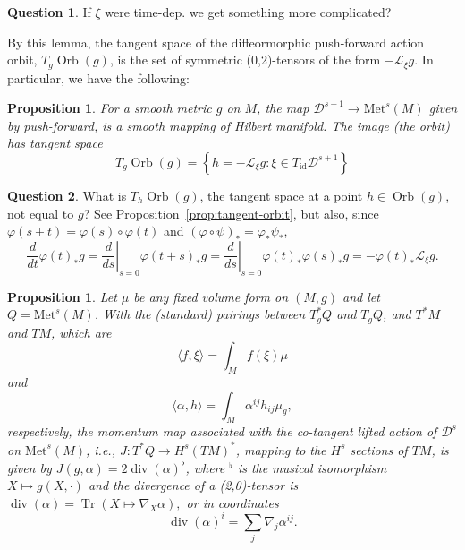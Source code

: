 \documentclass[a5paper,10pt,twoside]{article}
\newcommand{\cL}{\ensuremath{\mathcal{L}}}
\newcommand{\cD}{\ensuremath{\mathcal{D}}}
\newcommand{\Met}{\ensuremath{\mathrm{Met}}}
\DeclareMathOperator*{\Tr}{Tr}
\DeclareMathOperator*{\Orb}{Orb}
\DeclareMathOperator*{\Div}{div}
\DeclareMathOperator*{\id}{id}
\theoremstyle{plain}
\newtheorem{prop}[teo]{Proposition}
\theoremstyle{definition}
\newtheorem{question}{Question}
\theoremstyle{remark}
\begin{document}
\begin{question}
If $\xi$ were time-dep. we get something more complicated?
\end{question}

By this lemma, the tangent space of the diffeormorphic push-forward action orbit, $T_g\Orb(g)$, is the set of symmetric (0,2)-tensors of the form $-\cL_\xi g.$ In particular, we have the following:

\begin{prop}
For a smooth metric $g$ on $M$, the map $\cD^{s+1}\to \Met^s(M)$ given by push-forward, is a smooth mapping of  Hilbert manifold. The image (the orbit) has tangent space
%
\begin{equation}
T_g\Orb(g)=\left\{h=-\cL_\xi g: \xi\in T_{\id}\cD^{s+1}\right\}
\end{equation}
\end{prop}

\begin{question}
	What is $T_h\Orb(g)$, the tangent space at a point $h\in \Orb(g)$, not equal to $g$?
	See Proposition~\ref{prop:tangent-orbit}, but also, since $\varphi(s+t)=\varphi(s)\circ\varphi(t)$ and $(\varphi\circ\psi)_*=\varphi_*\psi_*$,
	\[
	\frac{d}{dt}\varphi(t)_*g = \left.\frac{d}{ds}\right|_{s=0}\varphi(t+s)_*g = \left.\frac{d}{ds}\right|_{s=0}\varphi(t)_*\varphi(s)_*g = -\varphi(t)_*\cL_\xi g .
	\]
\end{question}

\begin{prop}
\label{prop:Met-momentum-map}
	Let $\mu$ be any fixed volume form on $(M,g)$ and let $Q=\Met^s(M)$. With the (standard) pairings between $T^*_gQ$ and $T_gQ$, and $T^*M$ and $TM$, which are
	\[
	\langle f,\xi\rangle=\int_M f(\xi)\mu 
	\]
	and
	\[
	\langle \alpha,h\rangle =\int_M \alpha^{ij}h_{ij}\mu_g,
	\]
	respectively, the momentum map associated with the co-tangent lifted action of $\cD^s$ on $\Met^s(M)$, i.e., $J:T^*Q\to H^s(TM)^*$, mapping to the $H^s$ sections of $TM$, is given by $J(g,\alpha)=2\Div(\alpha)^\flat$, where $ ^\flat$ is the musical isomorphism $X\mapsto g(X,\cdot)$ and the divergence of a (2,0)-tensor is $\Div(\alpha)=\Tr(X\mapsto\nabla_X\alpha),$ or in coordinates $$ \Div(\alpha)^i=\sum_j\nabla_j\alpha^{ij}.$$
\end{prop}
\end{document}
